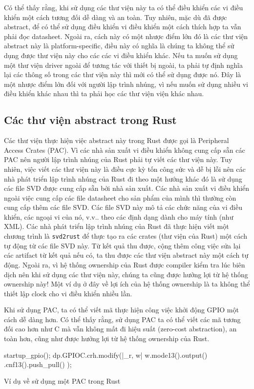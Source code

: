 Có thể thấy rằng, khi sử dụng các thư viện này ta có thể điều khiển các vi điều khiển một cách tương đối dễ dàng và an toàn.
Tuy nhiên, mặc dù đã được abstract, để có thể sử dụng điều khiển vi điều khiển một cách thích hợp ta vẫn phải đọc datasheet.
Ngoài ra, cách này có một nhược điểm lớn đó là các thư viện abstract này là platform-specific, điều này có nghĩa là chúng ta không thể sử dụng được thư viện này cho các các vi điều khiển khác.
Nếu ta muốn sử dụng một thư viện driver ngoài để tương tác với thiết bị ngoài, ta phải tự định nghĩa lại các thông số trong các thư viện này thì mới có thể sử dụng được nó.
Đây là một nhược điểm lớn đối với người lập trình nhúng, vì nếu muốn sử dụng nhiều vi điều khiển khác nhau thì ta phải học các thư viện viện khác nhau.

\subsection{Các thư viện abstract trong Rust}
Các thư viện thực hiện việc abstract này trong Rust được gọi là Peripheral Access Crates (PAC).
Vì các nhà sản xuất vi điều khiển không cung cấp sẵn các PAC nên người lập trình nhúng của Rust phải tự viết các thư viện này.
Tuy nhiên, việc viết các thư viện này là điều cực kỳ tốn công sức và dễ bị lỗi nên các nhà phát triển lập trình nhúng của Rust đi theo một hướng khác đó là sử dụng các file SVD được cung cấp sẵn bởi nhà sản xuất.
Các nhà sản xuất vi điều khiển ngoài việc cung cấp các file datasheet cho sản phẩm của mình thì thường còn cung cấp thêm các file SVD.
Các file SVD này mô tả các chức năng của vi điều khiển, các ngoại vi của nó, v.v.. theo các định dạng dành cho máy tính (như XML).
Các nhà phát triển lập trình nhúng của Rust đã thực hiện viết một chương trình là \texttt{svd2rust} để thực tạo ra các crates (thư viện của Rust) một cách tự động từ các file SVD này.
Từ kết quả thu được, cộng thêm công việc sửa lại các artifact từ kết quả nếu có,
ta thu được các thư viện abstract này một cách tự động.
Ngoài ra, vì hệ thống ownership của Rust được compiler kiểm tra lúc biên dịch nên khi sử dụng các thư viện này, chúng ta cũng được hưởng lợi từ hệ thống ownership này!
Một ví dụ ở đây về lợi ích của hệ thống ownership là ta không thể thiết lập clock cho vi điều khiển nhiều lần.

Khi sử dụng PAC, ta có thể viết mã thực hiện công việc khởi động GPIO một cách dễ dàng hơn.
Có thể thấy rằng, sử dụng PAC ta có thể viết các mã tương đối cao hơn như C mà vẫn không mất đi hiệu suất (zero-cost abstraction), an toàn hơn, cũng như được hưởng lợi từ hệ thống ownership của Rust.
\begin{listing}[ht]
\begin{rustcode}
startup_gpio();
dp.GPIOC.crh.modify(|_r, w| {
    w.mode13().output()
     .cnf13().push_pull()
});
\end{rustcode}
\caption{Ví dụ về sử dụng một PAC trong Rust}
\end{listing}

